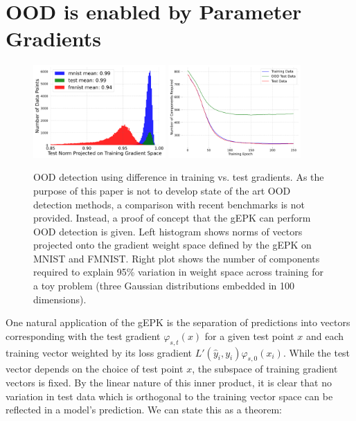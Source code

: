 \section{OOD is enabled by Parameter Gradients}
\label{sec:ood}
\begin{figure}[h]
\begin{center}
\includegraphics[width=0.45\textwidth]{c4a_figures/grad_alignment_hist.pdf}
\includegraphics[width=0.45\textwidth]{c4a_figures/ood_noise.pdf}
\end{center}
\caption{OOD detection using difference in training vs. test gradients. As the purpose of this paper is not to develop state of the art OOD detection methods, a comparison with recent benchmarks is not provided. Instead, a proof of concept that the gEPK can perform OOD detection is given. Left histogram shows norms of vectors projected onto the gradient weight space defined by the gEPK on MNIST and FMNIST. Right plot shows the number of components required to explain 95\% variation in weight space across training for a toy problem (three Gaussian distributions embedded in 100 dimensions). }
\label{fig:ood}
\end{figure}
One natural application of the gEPK is the separation of predictions into vectors corresponding with the test gradient $\varphi_{s,t}(x)$ for a given test point $x$ and each training vector  weighted by its loss gradient $L'(\hat y_i, y_i) \varphi_{s, 0}(x_i)$. While the test vector depends on the choice of test point $x$, the subspace of training gradient vectors is fixed. By the linear nature of this inner product, it is clear that no variation in test data which is orthogonal to the training vector space can be reflected in a model's prediction. We can state this as a theorem:
